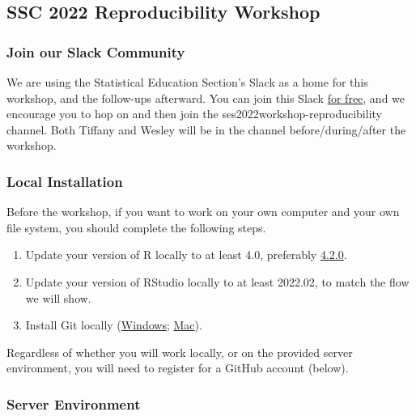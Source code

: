 \documentclass[
]{article}
\author{}
\date{\vspace{-2.5em}}
\providecommand{\tightlist}{%
  \setlength{\itemsep}{0pt}\setlength{\parskip}{0pt}}
\begin{document}
\hypertarget{ssc-2022-reproducibility-workshop}{%
\subsection{SSC 2022 Reproducibility
Workshop}\label{ssc-2022-reproducibility-workshop}}

\hypertarget{join-our-slack-community}{%
\subsubsection{Join our Slack
Community}\label{join-our-slack-community}}

We are using the Statistical Education Section's Slack as a home for
this workshop, and the follow-ups afterward. You can join this Slack
\href{https://join.slack.com/t/sscstatistics-2n57302/shared_invite/zt-roolxsm8-RXc3rjbi~BMyzutPL8UJ9w}{for
free}, and we encourage you to hop on and then join the
ses2022workshop-reproducibility channel. Both Tiffany and Wesley will be
in the channel before/during/after the workshop.

\hypertarget{local-installation}{%
\subsubsection{Local Installation}\label{local-installation}}

Before the workshop, if you want to work on your own computer and your
own file system, you should complete the following steps.

\begin{enumerate}
\def\labelenumi{\arabic{enumi}.}
\tightlist
\item
  Update your version of R locally to at least 4.0, preferably
  \href{https://cran.r-project.org/}{4.2.0}.
\item
  Update your version of RStudio locally to at least 2022.02, to match
  the flow we will show.
\item
  Install Git locally
  (\href{https://git-for-windows.github.io/}{Windows};
  \href{https://www.freecodecamp.org/news/install-xcode-command-line-tools/}{Mac}).
\end{enumerate}

Regardless of whether you will work locally, or on the provided server
environment, you will need to register for a GitHub account (below).

\hypertarget{server-environment}{%
\subsubsection{Server Environment}\label{server-environment}}
\end{document}
